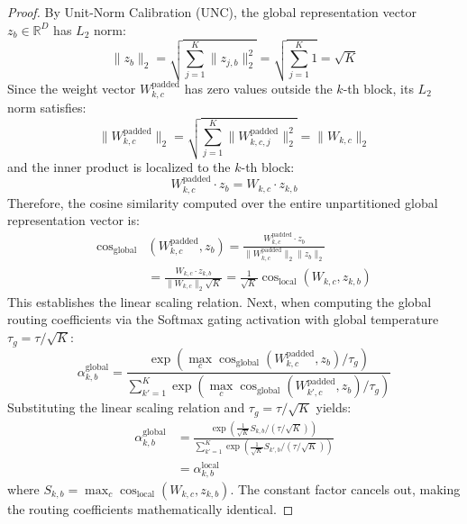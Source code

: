 \documentclass{article}
\theoremstyle{plain}
\theoremstyle{definition}
\theoremstyle{remark}
\begin{document}
\begin{proof}
By Unit-Norm Calibration (UNC), the global representation vector $z_b \in \mathbb{R}^D$ has $L_2$ norm:
\begin{equation}
\|z_b\|_2 = \sqrt{\sum_{j=1}^K \|z_{j, b}\|_2^2} = \sqrt{\sum_{j=1}^K 1} = \sqrt{K}
\end{equation}
Since the weight vector $W_{k, c}^{\text{padded}}$ has zero values outside the $k$-th block, its $L_2$ norm satisfies:
\begin{equation}
\|W_{k, c}^{\text{padded}}\|_2 = \sqrt{\sum_{j=1}^K \|W_{k, c, j}^{\text{padded}}\|_2^2} = \|W_{k, c}\|_2
\end{equation}
and the inner product is localized to the $k$-th block:
\begin{equation}
W_{k, c}^{\text{padded}} \cdot z_b = W_{k, c} \cdot z_{k, b}
\end{equation}
Therefore, the cosine similarity computed over the entire unpartitioned global representation vector is:
\begin{equation}
\begin{aligned}
\cos_{\text{global}}&(W_{k, c}^{\text{padded}}, z_b) = \frac{W_{k, c}^{\text{padded}} \cdot z_b}{\|W_{k, c}^{\text{padded}}\|_2 \|z_b\|_2} \\
&= \frac{W_{k, c} \cdot z_{k, b}}{\|W_{k, c}\|_2 \sqrt{K}} = \frac{1}{\sqrt{K}} \cos_{\text{local}}(W_{k, c}, z_{k, b})
\end{aligned}
\end{equation}
This establishes the linear scaling relation. Next, when computing the global routing coefficients via the Softmax gating activation with global temperature $\tau_g = \tau / \sqrt{K}$:
\begin{equation}
\alpha^{\text{global}}_{k, b} = \frac{\exp\left(\max_c \cos_{\text{global}}(W_{k, c}^{\text{padded}}, z_b) / \tau_g\right)}{\sum_{k'=1}^K \exp\left(\max_c \cos_{\text{global}}(W_{k', c}^{\text{padded}}, z_b) / \tau_g\right)}
\end{equation}
Substituting the linear scaling relation and $\tau_g = \tau / \sqrt{K}$ yields:
\begin{equation}
\begin{aligned}
\alpha^{\text{global}}_{k, b} &= \frac{\exp\left( \frac{1}{\sqrt{K}} S_{k, b} / (\tau/\sqrt{K}) \right)}{\sum_{k'=1}^K \exp\left( \frac{1}{\sqrt{K}} S_{k', b} / (\tau/\sqrt{K}) \right)} \\
&= \alpha^{\text{local}}_{k, b}
\end{aligned}
\end{equation}
where $S_{k, b} = \max_c \cos_{\text{local}}(W_{k, c}, z_{k, b})$. The constant factor cancels out, making the routing coefficients mathematically identical.
\end{proof}
\end{document}
